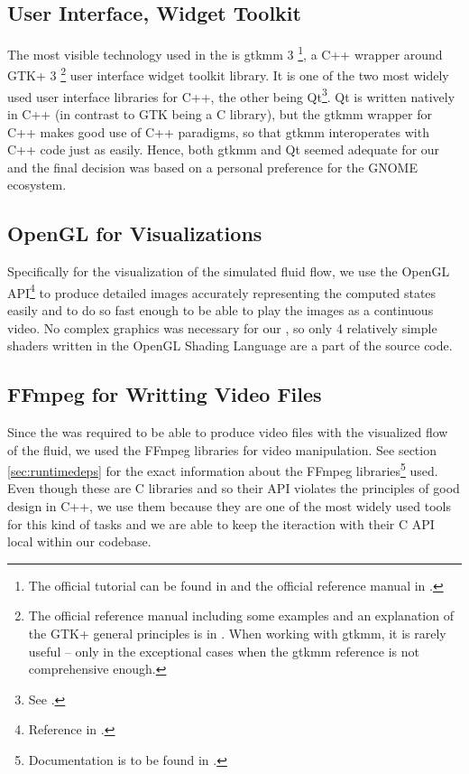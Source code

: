\documentclass[11pt,a4paper,twoside,openright]{report}
\begin{document}
\subsection{User Interface, Widget Toolkit}
The most visible technology used in the \software{} is gtkmm 3 \footnote{The official tutorial can be found in \cite{gtkmm3} and the official reference manual in \cite{gtkmm3ref}.}, a C++ wrapper around GTK+ 3 \footnote{The official reference manual including some examples and an explanation of the GTK+ general principles is in \cite{gtk3ref}. When working with gtkmm, it is rarely useful -- only in the exceptional cases when the gtkmm reference is not comprehensive enough.} user interface widget toolkit library. It is one of the two most widely used user interface libraries for C++, the other being Qt\footnote{See \cite{qt}.}. Qt is written natively in C++ (in contrast to GTK being a C library), but the gtkmm wrapper for C++ makes good use of C++ paradigms, so that gtkmm interoperates with C++ code just as easily. Hence, both gtkmm and Qt seemed adequate for our \software{} and the final decision was based on a personal preference for the GNOME ecosystem.

\subsection{OpenGL for Visualizations}
Specifically for the visualization of the simulated fluid flow, we use the OpenGL API\footnote{Reference in \cite{openglref}.} to produce detailed images accurately representing the computed states easily and to do so fast enough to be able to play the images as a continuous video. No complex graphics was necessary for our \software{}, so only 4 relatively simple shaders written in the OpenGL Shading Language are a part of the source code.

\subsection{FFmpeg for Writting Video Files}
Since the \software{} was required to be able to produce video files with the visualized flow of the fluid, we used the FFmpeg libraries for video manipulation. See section \ref{sec:runtimedeps} for the exact information about the FFmpeg libraries\footnote{Documentation is to be found in \cite{ffmpegdoc}.} used. Even though these are C libraries and so their API violates the principles of good design in C++, we use them because they are one of the most widely used tools for this kind of tasks and we are able to keep the iteraction with their C API local within our codebase.
\end{document}
